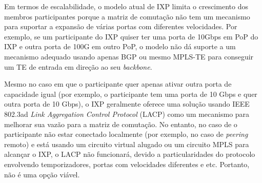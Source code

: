 \documentclass[12pt]{article}
\begin{document}

Em termos de escalabilidade, o modelo atual de IXP limita o crescimento dos membros participantes porque a matriz de comutação não tem um mecanismo para suportar a expansão de várias portas com diferentes velocidades. Por exemplo, se um participante do IXP quiser ter uma porta de 10Gbps em PoP do IXP e outra porta de 100G em outro PoP, o modelo não dá suporte a um mecanismo adequado usando apenas BGP ou mesmo MPLS-TE para conseguir um TE de entrada em direção ao seu \textit{backbone}.


Mesmo no caso em que o participante quer apenas ativar outra porta de capacidade igual (por exemplo, o participante tem uma porta de 10 Gbps e quer outra porta de 10 Gbps), o IXP geralmente oferece uma solução usando IEEE 802.3ad \textit{Link Aggregation Control Protocol} (LACP) como um mecanismo para melhorar sua vazão para a matriz de comutação. No entanto, no caso de o participante não estar conectado localmente (por exemplo, no caso de \textit{peering} remoto) e está usando um circuito virtual alugado ou um circuito MPLS para alcançar o IXP, o LACP não funcionará, devido a particularidades do protocolo envolvendo temporizadores, portas com velocidades diferentes e etc. Portanto, não é uma opção viável.

\end{document}
